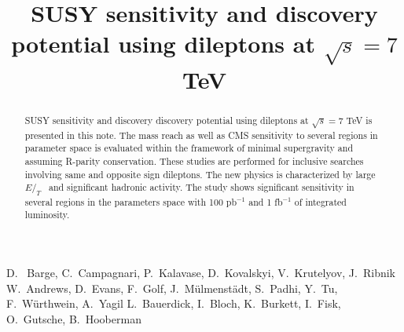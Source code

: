 \documentclass{cmspaper}
\newcommand{\met} {\ensuremath{E\!\!\!\!/_T}}
\begin{document}
%
\begin{titlepage}
\title{SUSY sensitivity and discovery potential using dileptons at $\sqrt{s} = 7 $ TeV}

  \begin{Authlist}
    D.~ Barge, C.~Campagnari, P.~Kalavase, D.~Kovalskyi, V.~Krutelyov, J.~Ribnik
    W.~Andrews, D.~Evans, F.~Golf, J.~M\"ulmenst\"adt, S.~Padhi, Y.~Tu, F.~W\"urthwein, A.~Yagil
    L.~Bauerdick, I.~Bloch, K.~Burkett, I.~Fisk, O.~Gutsche, B.~Hooberman
  \end{Authlist}

\begin{abstract}
SUSY sensitivity and discovery discovery potential using dileptons at $\sqrt{s} = 7 $ TeV
is presented in this note. The mass reach as well as CMS sensitivity to several regions in
parameter space is evaluated within the framework of minimal supergravity and assuming R-parity
conservation. These studies are performed for inclusive searches involving same and opposite 
sign dileptons. The new physics is characterized by large \met~ and significant hadronic 
activity. The study shows significant sensitivity in several regions in the parameters 
space with 100 pb$^{-1}$ and 1 fb$^{-1}$ of integrated luminosity.
\end{abstract}
\end{titlepage}




%




\clearpage

\end{document}

